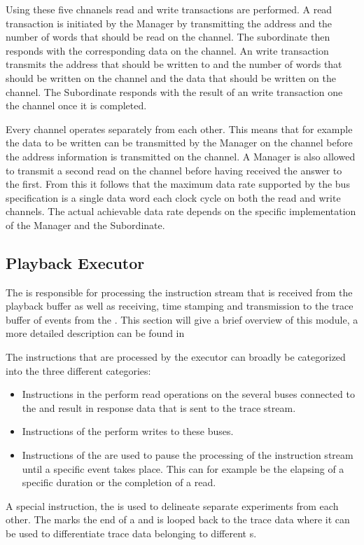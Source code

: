 Using these five chnanels read and write transactions are performed. A read transaction is initiated by the Manager by transmitting the address and the number of words that should be read on the \AR{} channel. The subordinate then responds with the corresponding data on the \R{} channel. An write transaction transmits the address that should be written to and the number of words that should be written on the \AW{} channel  and the data that should be written on the \W{} channel. The Subordinate responds with the result of an write transaction one the \B{} channel once it is completed.

Every channel operates separately from each other. This means that for example the data to be written can be transmitted by the Manager on the \W{} channel before the address information is transmitted on the \AW{} channel. A Manager is also allowed to transmit a second read on the \AR{} channel before having received the answer to the first.
From this it follows that the maximum data rate supported by the bus specification is a single data word each clock cycle on both the read and write channels. The actual achievable data rate depends on the specific implementation of the Manager and the Subordinate.

\subsection{Playback Executor}\label{sec:pb_exec}
The \pbexec{} is responsible for processing the instruction stream that is received from the playback buffer as well as receiving, time stamping and transmission to the trace buffer of events from the \ASIC{}. This section will give a brief overview of this module, a more detailed description can be found in \autocite{ref:pb_exec}

The instructions that are processed by the executor can broadly be categorized into the three different categories:
\begin{itemize}
\item Instructions in the \readCat{} perform read operations on the several buses connected to the \pbexec{} and result in response data that is sent to the trace stream.
\item Instructions of the \writeCat{} perform writes to these buses.
\item Instructions of the \waitCat{} are used to pause the processing of the instruction stream until a specific event takes place. This can for example be the elapsing of a specific duration or the completion of a read.
\end{itemize}
A special instruction, the \haltInstr{} is used to delineate separate experiments from each other. The \haltInstr{} marks the end of a \PlaybackProgram{} and is looped back to the trace data where it can be used to differentiate trace data belonging to different \PlaybackProgram{}s.


